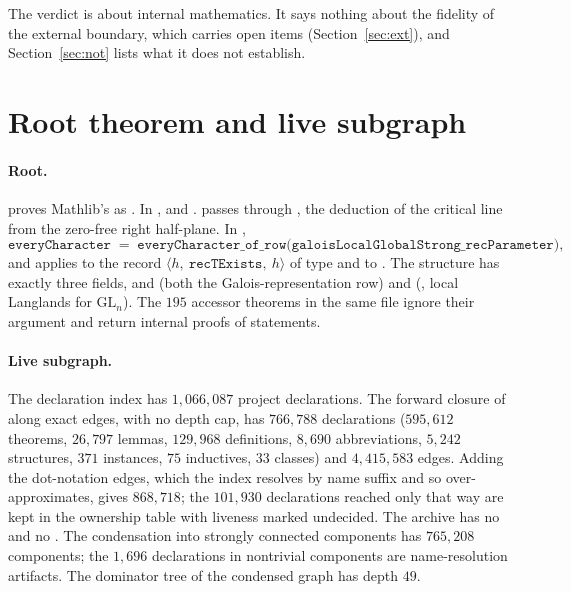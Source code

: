 \documentclass[10pt]{article}
\begin{document}
The verdict is about internal mathematics. It says nothing about the fidelity of the external boundary, which carries open items (Section~\ref{sec:ext}), and Section~\ref{sec:not} lists what it does not establish.

\section{Root theorem and live subgraph}\label{sec:root}

\paragraph{Root.}  proves Mathlib's  as . In ,  and .  passes through , the deduction of the critical line from the zero-free right half-plane. In ,
\[
\texttt{everyCharacter} \;=\; \texttt{everyCharacter\_of\_row}\bigl(\texttt{galoisLocalGlobalStrong\_recParameter}\bigr),
\]
and  applies  to the record $\langle h,\ \texttt{recTExists},\ h\rangle$ of type  and to . The structure  has exactly three fields,  and  (both the Galois-representation row) and  (, local Langlands for $\mathrm{GL}_n$). The $195$ accessor theorems  in the same file ignore their argument and return internal proofs of  statements.

\paragraph{Live subgraph.} The declaration index has $1{,}066{,}087$ project declarations. The forward closure of  along exact edges, with no depth cap, has $766{,}788$ declarations ($595{,}612$ theorems, $26{,}797$ lemmas, $129{,}968$ definitions, $8{,}690$ abbreviations, $5{,}242$ structures, $371$ instances, $75$ inductives, $33$ classes) and $4{,}415{,}583$ edges. Adding the dot-notation edges, which the index resolves by name suffix and so over-approximates, gives $868{,}718$; the $101{,}930$ declarations reached only that way are kept in the ownership table with liveness marked undecided. The archive has no  and no . The condensation into strongly connected components has $765{,}208$ components; the $1{,}696$ declarations in nontrivial components are name-resolution artifacts. The dominator tree of the condensed graph has depth $49$.
\end{document}
